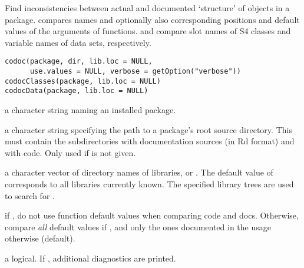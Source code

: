%
\begin{Description}\relax
Find inconsistencies between actual and documented `structure'
of \R{} objects in a package.   compares names and
optionally also corresponding positions and default values of the
arguments of functions.   and 
compare slot names of S4 classes and variable names of data sets,
respectively.
\end{Description}
%
\begin{Usage}
\begin{verbatim}
codoc(package, dir, lib.loc = NULL,
      use.values = NULL, verbose = getOption("verbose"))
codocClasses(package, lib.loc = NULL)
codocData(package, lib.loc = NULL)
\end{verbatim}
\end{Usage}
%
\begin{Arguments}
\begin{ldescription}
\item[\code{package}] a character string naming an installed package.
\item[\code{dir}] a character string specifying the path to a package's root
source directory.  This must contain the subdirectories 
with \R{} documentation sources (in Rd format) and  with \R{}
code.  Only used if  is not given.
\item[\code{lib.loc}] a character vector of directory names of \R{} libraries,
or .  The default value of  corresponds to all
libraries currently known.  The specified library trees are used to
search for .
\item[\code{use.values}] if , do not use function default values
when comparing code and docs.  Otherwise, compare \emph{all} default
values if , and only the ones documented in the usage
otherwise (default).
\item[\code{verbose}] a logical.  If , additional diagnostics are
printed.
\end{ldescription}
\end{Arguments}
%
